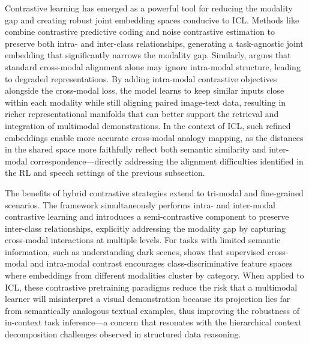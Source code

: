 \documentclass[11pt]{article}
\begin{document}
Contrastive learning has emerged as a powerful tool for reducing the modality gap and creating robust joint embedding spaces conducive to ICL. Methods like \cite{ref154} combine contrastive predictive coding and noise contrastive estimation to preserve both intra- and inter-class relationships, generating a task-agnostic joint embedding that significantly narrows the modality gap. Similarly, \cite{ref155} argues that standard cross-modal alignment alone may ignore intra-modal structure, leading to degraded representations. By adding intra-modal contrastive objectives alongside the cross-modal loss, the model learns to keep similar inputs close within each modality while still aligning paired image-text data, resulting in richer representational manifolds that can better support the retrieval and integration of multimodal demonstrations. In the context of ICL, such refined embeddings enable more accurate cross-modal analogy mapping, as the distances in the shared space more faithfully reflect both semantic similarity and inter-modal correspondence---directly addressing the alignment difficulties identified in the RL and speech settings of the previous subsection.

The benefits of hybrid contrastive strategies extend to tri-modal and fine-grained scenarios. The \cite{ref156} framework simultaneously performs intra- and inter-modal contrastive learning and introduces a semi-contrastive component to preserve inter-class relationships, explicitly addressing the modality gap by capturing cross-modal interactions at multiple levels. For tasks with limited semantic information, such as understanding dark scenes, \cite{ref157} shows that supervised cross-modal and intra-modal contrast encourages class-discriminative feature spaces where embeddings from different modalities cluster by category. When applied to ICL, these contrastive pretraining paradigms reduce the risk that a multimodal learner will misinterpret a visual demonstration because its projection lies far from semantically analogous textual examples, thus improving the robustness of in-context task inference---a concern that resonates with the hierarchical context decomposition challenges observed in structured data reasoning.
\end{document}
